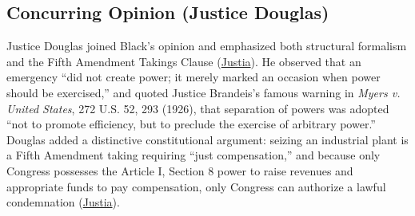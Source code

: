 \documentclass[12pt]{article}
\begin{document}
\subsection{Concurring Opinion (Justice Douglas)}
Justice Douglas joined Black's opinion and emphasized both structural formalism and the Fifth Amendment Takings Clause (\href{https://supreme.justia.com/cases/federal/us/343/579/}{Justia}). He observed that an emergency ``did not create power; it merely marked an occasion when power should be exercised,'' and quoted Justice Brandeis's famous warning in \textit{Myers v. United States}, 272 U.S. 52, 293 (1926), that separation of powers was adopted ``not to promote efficiency, but to preclude the exercise of arbitrary power.'' Douglas added a distinctive constitutional argument: seizing an industrial plant is a Fifth Amendment taking requiring ``just compensation,'' and because only Congress possesses the Article I, Section 8 power to raise revenues and appropriate funds to pay compensation, only Congress can authorize a lawful condemnation (\href{https://supreme.justia.com/cases/federal/us/343/579/}{Justia}).
\end{document}
